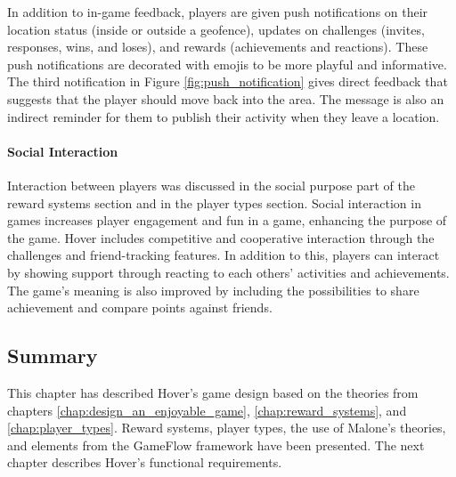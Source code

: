 In addition to in-game feedback, players are given push notifications on their location status (inside or outside a geofence), updates on challenges (invites, responses, wins, and loses), and rewards (achievements and reactions). These push notifications are decorated with emojis to be more playful and informative. The third notification in Figure \ref{fig:push_notification} gives direct feedback that suggests that the player should move back into the area. The message is also an indirect reminder for them to publish their activity when they leave a location.

\paragraph*{Social Interaction} 
Interaction between players was discussed in the social purpose part of the reward systems section and in the player types section. Social interaction in games increases player engagement and fun in a game, enhancing the purpose of the game. Hover includes competitive and cooperative interaction through the challenges and friend-tracking features. In addition to this, players can interact by showing support through reacting to each others’ activities and achievements. The game’s meaning is also improved by including the possibilities to share achievement and compare points against friends.

\subsection{Summary}
This chapter has described Hover’s game design based on the theories from chapters \ref{chap:design_an_enjoyable_game}, \ref{chap:reward_systems}, and \ref{chap:player_types}. Reward systems, player types, the use of Malone’s theories, and elements from the GameFlow framework have been presented. The next chapter describes Hover’s functional requirements.